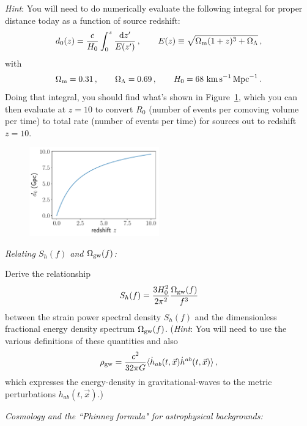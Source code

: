\documentclass[11pt]{article}
\numberwithin{equation}{section}
\def\be{\begin{equation}}
\def\ee{\end{equation}}
\def\i{\item{}}
\def\D{{\rm d}}
\begin{document}
{\em Hint}: You will need to do numerically evaluate the
following integral for proper distance today as a function 
of source redshift:
%
\be
d_0(z) = \frac{c}{H_0}\int_0^z\frac{\D z'}{E(z')}\,,
\qquad
E(z)\equiv \sqrt{\Omega_{\rm m}(1+z)^3 + \Omega_\Lambda}\,,
\ee
%
with 
%
\be
\Omega_{\rm m}=0.31\,,
\qquad
\Omega_\Lambda=0.69\,,
\qquad
H_0 = 68~{\rm km}\,{\rm s}^{-1}\, {\rm Mpc}^{-1}\,.
\ee
Doing that integral, you should find what's shown in
Figure~\ref{f:d0vsz}, which you can then evaluate at
$z=10$ to convert $R_0$ (number of events per 
comoving volume per time) to total rate (number of 
events per time) for sources out to redshift $z=10$.
%
\begin{figure}[htbp!]
\begin{center}
\includegraphics[width=0.5\textwidth]{Figures/d0vsz}
\caption{}
\label{f:d0vsz}
\end{center}
\end{figure}
%

\i {\em Relating $S_h(f)$ and $\Omega_{\rm gw}(f)$:}

Derive the relationship 
\be
S_h(f) = \frac{3 H_0^2}{2\pi^2}\frac{\Omega_{\rm gw}(f)}{f^3}
\ee
between the strain power spectral density $S_h(f)$ and the 
dimensionless fractional energy density spectrum $\Omega_{\rm gw}(f)$.
({\em Hint}: You will need to use the various definitions of these
quantities and also 
\be
\rho_{\rm gw} =\frac{c^2}{32\pi G}\langle \dot h_{ab}(t,\vec x)\dot h^{ab}(t,\vec x)\rangle\,,
\ee
which expresses the energy-density in gravitational-waves to 
the metric perturbations $h_{ab}(t,\vec x)$.)

\i {\em Cosmology and the ``Phinney formula" for astrophysical backgrounds:}
\end{document}
